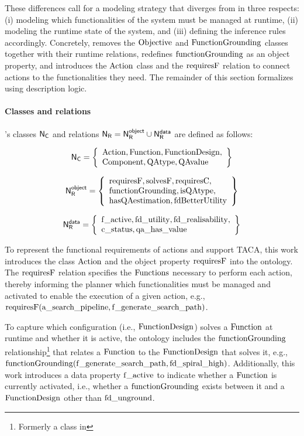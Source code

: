 These differences call for a modeling strategy that diverges from \tomasys in three respects: (i) modeling which functionalities of the system must be managed at runtime, (ii) modeling the runtime state of the system, and (iii) defining the inference rules accordingly. Concretely, \pddltomasys removes the $\operatorname{Objective}$ and $\operatorname{FunctionGrounding}$ classes together with their runtime relations, redefines $\operatorname{functionGrounding}$ as an object property, and introduces the $\operatorname{Action}$ class and the $\operatorname{requiresF}$ relation to connect actions to the functionalities they need. The remainder of this section formalizes \pddltomasys using description logic.

\paragraph{Classes and relations} \pddltomasys's classes $\mathsf{N}_\mathsf{C}$ and relations $\mathsf{N_R} = \mathsf{N_R^{object}} \cup \mathsf{N_R^{data}}$ are defined as follows:


\[
\mathsf{N}_\mathsf{C} = \left\lbrace \begin{array}{l}
  \operatorname{Action}, \operatorname{Function}, \operatorname{FunctionDesign}, \\
  \operatorname{Component}, \operatorname{QAtype}, \operatorname{QAvalue}
\end{array}\right\rbrace
\]

\[
\mathsf{N_R^{object}} = \left\lbrace\begin{array}{l}
  \operatorname{requiresF}, \operatorname{solvesF}, \operatorname{requiresC}, \\
  \operatorname{functionGrounding}, \operatorname{isQAtype}, \\
  \operatorname{hasQAestimation}, \operatorname{fdBetterUtility}
\end{array}\right\rbrace
\]

\[
\mathsf{N_R^{data}} = \left\lbrace\begin{array}{l}
	\operatorname{f\_active}, \operatorname{fd\_utility}, \operatorname{fd\_realisability}, \\
        \operatorname{c\_status}, \operatorname{qa\_has\_value}
\end{array}\right\rbrace
\]

To represent the functional requirements of actions and support TACA, this work introduces the class $\operatorname{Action}$ and the object property $\operatorname{requiresF}$ into the ontology. The $\operatorname{requiresF}$ relation specifies the $\operatorname{Functions}$ necessary to perform each action, thereby informing the planner which functionalities must be managed and activated to enable the execution of a given action, e.g., $\operatorname{requiresF}(\operatorname{a\_search\_pipeline}, \operatorname{f\_generate\_search\_path})$.

To capture which configuration (i.e., $\operatorname{FunctionDesign}$) solves a $\operatorname{Function}$ at runtime and whether it is active, the ontology includes the $\operatorname{functionGrounding}$ relationship\footnote{Formerly a class in \tomasys} that relates a $\operatorname{Function}$ to the $\operatorname{FunctionDesign}$ that solves it, e.g., $\operatorname{functionGrounding}(\operatorname{f\_generate\_search\_path}, \operatorname{fd\_spiral\_high})$. Additionally, this work introduces a data property $\operatorname{f\_active}$ to indicate whether a $\operatorname{Function}$ is currently activated, i.e., whether a $\operatorname{functionGrounding}$ exists between it and a $\operatorname{FunctionDesign}$ other than $\operatorname{fd\_unground}$.

